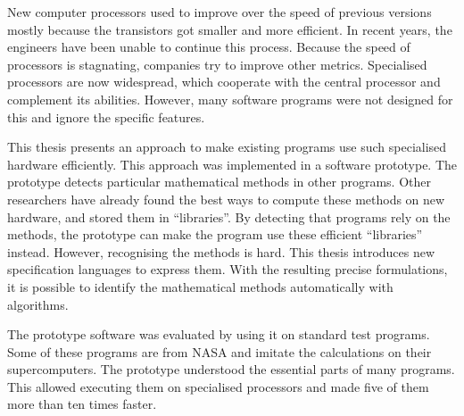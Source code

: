 
    New computer processors used to improve over the speed of previous versions
    mostly because the transistors got smaller and more efficient.
    In recent years, the engineers have been unable to continue this process.
    Because the speed of processors is stagnating, companies try to improve
    other metrics.
    Specialised processors are now widespread, which cooperate with the central
    processor and complement its abilities.
    However, many software programs were not designed for this and ignore the
    specific features.

    This thesis presents an approach to make existing programs use such
    specialised hardware efficiently.
    This approach was implemented in a software prototype.
    The prototype detects particular mathematical methods in other programs.
    Other researchers have already found the best ways to compute these
    methods on new hardware, and stored them in ``libraries''.
    By detecting that programs rely on the methods, the prototype can make the
    program use these efficient ``libraries'' instead.
    However, recognising the methods is hard.
    This thesis introduces new specification languages to express them.
    With the resulting precise formulations, it is possible to identify the
    mathematical methods automatically with algorithms.

    The prototype software was evaluated by using it on standard test programs.
    Some of these programs are from NASA and imitate the calculations on their
    supercomputers.
    The prototype understood the essential parts of many programs.
    This allowed executing them on specialised processors and made five of them
    more than ten times faster.
